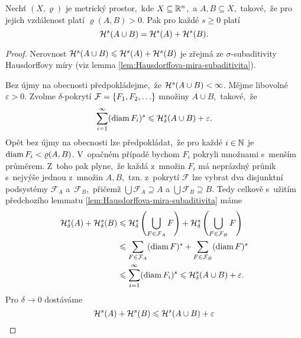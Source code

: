 \begin{lemma}\label{lem:hausdorffova-mira-sigma-aditivita-kladna-vzdalenost}
    Nechť $(X,\varrho)$ je metrický prostor,~kde $X\subseteq\mathbb{R}^n$,~a $A,B\subseteq X$,~takové,~že pro jejich vzdálenost platí $\varrho(A,B)>0$. Pak pro každé $s\geqslant 0$ platí
    \[\mathcal{H}^{s}(A\cup B)=\mathcal{H}^{s}(A)+\mathcal{H}^{s}(B).\]
\end{lemma}
\begin{proof}
    Nerovnost $\mathcal{H}^{s}(A\cup B)\leqslant\mathcal{H}^{s}(A)+\mathcal{H}^{s}(B)$ je zřejmá ze $\sigma$-subaditivity Hausdorffovy míry (viz lemma \ref{lem:Hausdorffova-mira-subaditivita}).

    Bez újmy na obecnosti předpokládejme,~že $\mathcal{H}^{s}(A\cup B)<\infty$. Mějme libovolné $\varepsilon>0$. Zvolme $\delta$-pokrytí $\mathcal{F}=\left\{F_1,F_2,\ldots\right\}$ množiny $A\cup B$,~takové,~že
    \[\sum_{i=1}^{\infty}(\operatorname{diam}{F_i})^s\leqslant\mathcal{H}_{\delta}^{s}(A\cup B)+\varepsilon.\]
    Opět bez újmy na obecnosti lze předpokládat,~že pro každé $i\in\mathbb{N}$ je $\operatorname{diam}{F_i}<\varrho(A,B)$. V~opačném případě bychom $F_i$ pokryli množnami s~menším průměrem. Z~toho pak plyne,~že každá z~množin $F_i$ má neprázdný průnik s~nejvýše jednou z~množin $A,B$,~tzn. z~pokrytí $\mathcal{F}$ lze vybrat dva disjunktní podsystémy $\mathcal{F}_A$ a~$\mathcal{F}_B$,~přičemž $\bigcup\mathcal{F}_A\supseteq A$ a $\bigcup\mathcal{F}_B\supseteq B$. Tedy celkově s~užitím předchozího lemmatu \ref{lem:Hausdorffova-mira-subaditivita} máme
    \begin{align*}
        \mathcal{H}_{\delta}^{s}(A)+\mathcal{H}_{\delta}^{s}(B)&\leqslant\mathcal{H}_{\delta}^{s}\left(\bigcup_{F\in\mathcal{F}_A}F\right)+\mathcal{H}_{\delta}^{s}\left(\bigcup_{F\in\mathcal{F}_B}F\right)\\
        &\leqslant\sum_{F\in\mathcal{F}_A}(\operatorname{diam}{F})^s+\sum_{F\in\mathcal{F}_B}(\operatorname{diam}{F})^s\\
        &\leqslant\sum_{i=1}^{\infty}(\operatorname{diam}{F_i})^s\leqslant\mathcal{H}_{\delta}^{s}(A\cup B)+\varepsilon.
    \end{align*}
    Pro $\delta\to 0$ dostáváme
    \[\mathcal{H}^{s}(A)+\mathcal{H}^{s}(B)\leqslant\mathcal{H}^{s}(A\cup B)+\varepsilon\]
\end{proof}

